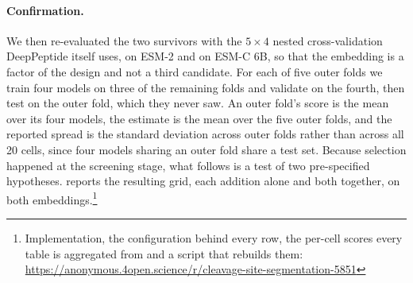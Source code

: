 \documentclass{article}
\begin{document}
\paragraph{Confirmation.}
\label{sec:eval-protocol}
We then re-evaluated the two survivors with the $5\times4$ nested cross-validation
DeepPeptide itself uses, on ESM-2 and on ESM-C 6B, so that the embedding is a
factor of the design and not a third candidate. For each of five outer folds we
train four models on three of the remaining folds and validate on the fourth,
then test on the outer fold, which they never saw. An outer fold's score is the
mean over its four models, the estimate is the mean over the five outer folds,
and the reported spread is the standard deviation across outer folds rather than
across all 20 cells, since four models sharing an outer fold share a test set.
Because selection happened at the screening stage, what follows is a test of two
pre-specified hypotheses.  reports the resulting grid, each
addition alone and both together, on both embeddings.\footnote{Implementation, the configuration behind every row, the per-cell scores every table is aggregated from and a script that rebuilds them: \url{https://anonymous.4open.science/r/cleavage-site-segmentation-5851}}
\end{document}
